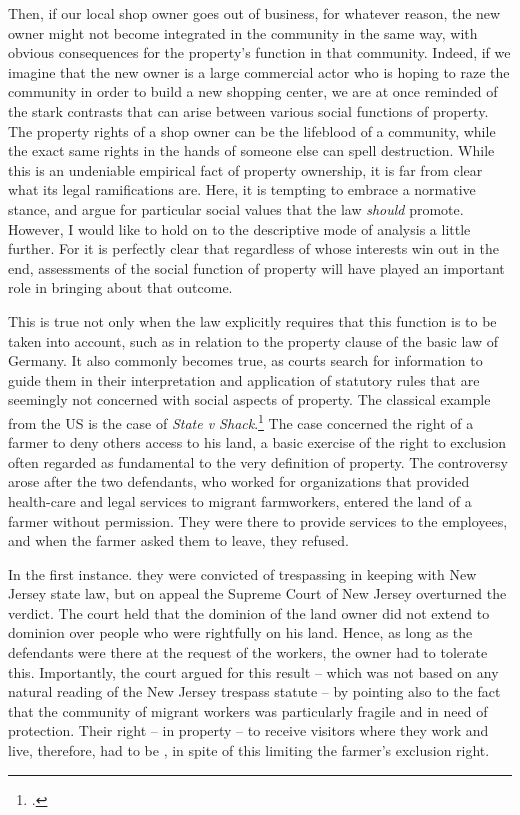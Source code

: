 Then, if our local shop owner goes out of business, for whatever reason, the new owner might not become integrated in the community in the same way, with obvious consequences for the property's function in that community. Indeed, if we imagine that the new owner is a large commercial actor who is hoping to raze the community in order to build a new shopping center, we are at once reminded of the stark contrasts that can arise between various social functions of property. The property rights of a shop owner can be the lifeblood of a community, while the exact same rights in the hands of someone else can spell destruction. While this is an undeniable empirical fact of property ownership, it is far from clear what its legal ramifications are. Here, it is tempting to embrace a normative stance, and argue for particular social values that the law {\it should} promote. However, I would like to hold on to the descriptive mode of analysis a little further. For it is perfectly clear that regardless of whose interests win out in the end, assessments of the social function of property will have played an important role in bringing about that outcome.

This is true not only when the law explicitly requires that this function is to be taken into account, such as in relation to the property clause of the basic law of Germany. It also commonly becomes true, as courts search for information to guide them in their interpretation and application of statutory rules that are seemingly not concerned with social aspects of property. The classical example from the US is the case of {\it State v Shack}.\footcite{shack71} The case concerned the right of a farmer to deny others access to his land, a basic exercise of the right to exclusion often regarded as fundamental to the very definition of property. The controversy arose after the two defendants, who worked for organizations that provided health-care and legal services to migrant farmworkers, entered the land of a farmer without permission. They were there to provide services to the  employees, and when the farmer asked them to leave, they refused.

In the first instance. they were convicted of trespassing in keeping with New Jersey state law, but on appeal the Supreme Court of New Jersey overturned the verdict. The court held that the dominion of the land owner did not extend to dominion over people who were rightfully on his land. Hence, as long as the defendants were there at the request of the workers, the owner had to tolerate this. Importantly, the court argued for this result -- which was not based on any natural reading of the New Jersey trespass statute -- by pointing also to the fact that the community of migrant workers was particularly fragile and in need of protection. Their right -- in property -- to receive visitors where they work and live, therefore, had to be , in spite of this limiting the farmer's exclusion right.

